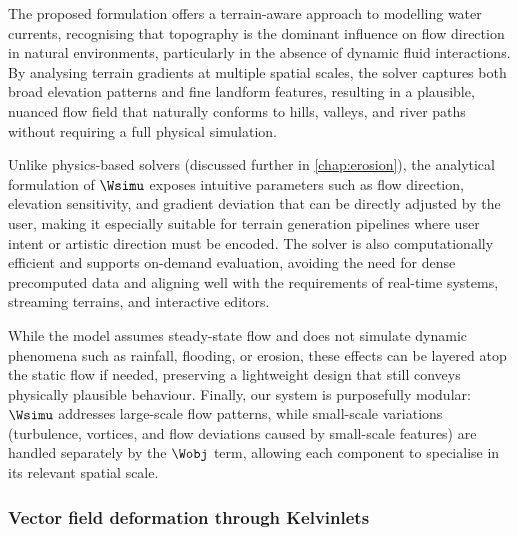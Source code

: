 The proposed formulation offers a terrain-aware approach to modelling water currents, recognising that topography is the dominant influence on flow direction in natural environments, particularly in the absence of dynamic fluid interactions. By analysing terrain gradients at multiple spatial scales, the solver captures both broad elevation patterns and fine landform features, resulting in a plausible, nuanced flow field that naturally conforms to hills, valleys, and river paths without requiring a full physical simulation.

Unlike physics-based solvers (discussed further in \cref{chap:erosion}), the analytical formulation of $\Wsimu$ exposes intuitive parameters such as flow direction, elevation sensitivity, and gradient deviation that can be directly adjusted by the user, making it especially suitable for terrain generation pipelines where user intent or artistic direction must be encoded. The solver is also computationally efficient and supports on-demand evaluation, avoiding the need for dense precomputed data and aligning well with the requirements of real-time systems, streaming terrains, and interactive editors.

While the model assumes steady-state flow and does not simulate dynamic phenomena such as rainfall, flooding, or erosion, these effects can be layered atop the static flow if needed, preserving a lightweight design that still conveys physically plausible behaviour. Finally, our system is purposefully modular: $\Wsimu$ addresses large-scale flow patterns, while small-scale variations (turbulence, vortices, and flow deviations caused by small-scale features) are handled separately by the $\Wobj$ term, allowing each component to specialise in its relevant spatial scale.

\subsubsection{Vector field deformation through Kelvinlets}


